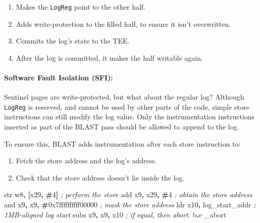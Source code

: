 \documentclass[a4paper, nobind]{templates/ociamthesis}
\providecommand{\tightlist}{%
  \setlength{\itemsep}{0pt}\setlength{\parskip}{0pt}}
\newenvironment{Shaded}{\begin{snugshade}}{\end{snugshade}}
\newcommand{\BaseNTok}[1]{\textcolor[rgb]{0.00,0.00,0.81}{#1}}
\newcommand{\BuiltInTok}[1]{#1}
\newcommand{\CommentTok}[1]{\textcolor[rgb]{0.56,0.35,0.01}{\textit{#1}}}
\newcommand{\DecValTok}[1]{\textcolor[rgb]{0.00,0.00,0.81}{#1}}
\newcommand{\NormalTok}[1]{#1}
\newcommand{\OperatorTok}[1]{\textcolor[rgb]{0.81,0.36,0.00}{\textbf{#1}}}
\renewenvironment{Shaded}
{
  \vspace{10pt}%
  \begin{snugshade}%
}{%
  \end{snugshade}%
  \vspace{8pt}%
}
\begin{document}
\begin{enumerate}
\def\labelenumi{\arabic{enumi}.}
\tightlist
\item
  Makes the \texttt{LogReg} point to the other half.
\item
  Adds write-protection to the filled half, to ensure it isn't overwritten.
\item
  Commits the log's state to the TEE.
\item
  After the log is committed, it makes the half writable again.
\end{enumerate}

\paragraph{Software Fault Isolation (SFI):}\label{blastsfi}

Sentinel pages are write-protected, but what about the regular log?
Although \texttt{LogReg} is reserved, and cannot be used by other parts of the code,
simple store instructions can still modify the log value. Only the instrumentation
instructions inserted as part of the BLAST pass should be allowed to append to the log.

To ensure this, BLAST adds instrumentation after each store instruction to:

\begin{enumerate}
\def\labelenumi{\arabic{enumi}.}
\tightlist
\item
  Fetch the store address and the log's address.
\item
  Check that the store address doesn't lie inside the log.
\end{enumerate}

\begin{Shaded}
\begin{Highlighting}[]
\BuiltInTok{str}\NormalTok{ w8}\OperatorTok{,} \OperatorTok{[}\NormalTok{x29}\OperatorTok{,} \OperatorTok{\#}\DecValTok{4}\OperatorTok{]}                 \CommentTok{; perform the store}
\BuiltInTok{add}\NormalTok{ x9}\OperatorTok{,}\NormalTok{ x29}\OperatorTok{,} \OperatorTok{\#}\DecValTok{4}                   \CommentTok{; obtain the store address}
\BuiltInTok{and}\NormalTok{ x9}\OperatorTok{,}\NormalTok{ x9}\OperatorTok{,} \OperatorTok{\#}\BaseNTok{0x7ffffffffff00000}   \CommentTok{; mask the store address}
\NormalTok{ldr x10}\OperatorTok{,}\NormalTok{ log\_start\_addr           }\CommentTok{; 1MB{-}aligned log start}
\NormalTok{subs x9}\OperatorTok{,}\NormalTok{ x9}\OperatorTok{,}\NormalTok{ x10                  }\CommentTok{; if equal, then abort.}
\NormalTok{b}\OperatorTok{.}\NormalTok{e \_abort}
\end{Highlighting}
\end{Shaded}
\end{document}
